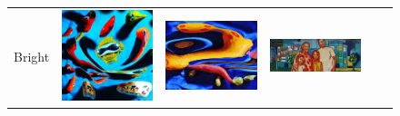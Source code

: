 \begin{figure}
\begin{minipage}[t]{\textwidth}
\begin{tabular}{m{.01\linewidth} m{.16\linewidth} m{.16\linewidth} m{.16\linewidth} m{.16\linewidth} m{.16\linewidth}}
    \begin{turn}{90}\small{Bright}\end{turn} &
    \includegraphics[width=\linewidth]{../style/figures/flickr_on_flickr/pred_style_Bright/0.jpg} &
    \includegraphics[width=\linewidth]{../style/figures/flickr_on_flickr/pred_style_Bright/1.jpg} &
    \includegraphics[width=\linewidth]{../style/figures/flickr_on_flickr/pred_style_Bright/2.jpg} &

\end{tabular}
\end{minipage}
\end{figure}

